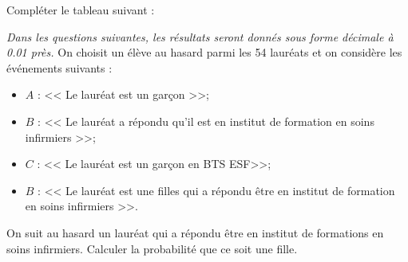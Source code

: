 \begin{questions}
	\question[2] Compléter le tableau suivant :
	
	\begin{center}		
		
	\end{center}
	
	
	\textit{Dans les questions suivantes, les résultats seront donnés sous forme décimale à \num{0.01} près.}
	\question On choisit un élève au hasard parmi les 54 lauréats et on considère les événements suivants :
	\begin{itemize}
		\item $A$ : << Le lauréat est un garçon >>;
		\item $B$ : << Le lauréat a répondu qu'il est en institut de formation en soins infirmiers >>;
		\item $C$ : << Le lauréat est un garçon  en BTS ESF>>;
		\item $B$ : << Le lauréat est une filles qui a répondu être en institut de formation en soins infirmiers >>.
	\end{itemize}

	
	\question[2] On suit au hasard un lauréat qui a répondu être en institut de formations en soins infirmiers. Calculer la probabilité que ce soit une fille. 
\end{questions}